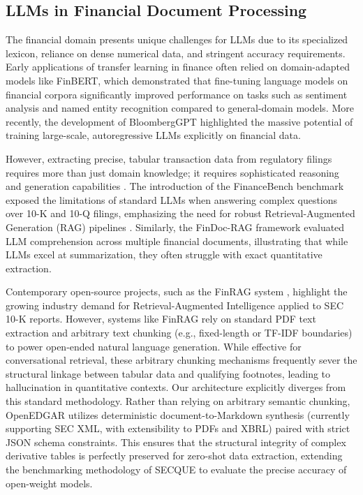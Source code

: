 \documentclass[journal, onecolumn]{IEEEtran}
\begin{document}
\subsection{LLMs in Financial Document Processing}
The financial domain presents unique challenges for LLMs due to its specialized lexicon, reliance on dense numerical data, and stringent accuracy requirements. Early applications of transfer learning in finance often relied on domain-adapted models like FinBERT, which demonstrated that fine-tuning language models on financial corpora significantly improved performance on tasks such as sentiment analysis and named entity recognition compared to general-domain models. More recently, the development of BloombergGPT \cite{wu2023bloomberggpt} highlighted the massive potential of training large-scale, autoregressive LLMs explicitly on financial data. 

However, extracting precise, tabular transaction data from regulatory filings requires more than just domain knowledge; it requires sophisticated reasoning and generation capabilities \cite{eval_table_extraction_2025}. The introduction of the FinanceBench benchmark \cite{islam2023financebench} exposed the limitations of standard LLMs when answering complex questions over 10-K and 10-Q filings, emphasizing the need for robust Retrieval-Augmented Generation (RAG) pipelines \cite{lewis2020rag}. Similarly, the FinDoc-RAG framework \cite{gu2025findocrag} evaluated LLM comprehension across multiple financial documents, illustrating that while LLMs excel at summarization, they often struggle with exact quantitative extraction. 

Contemporary open-source projects, such as the FinRAG system \cite{salunke2024finrag}, highlight the growing industry demand for Retrieval-Augmented Intelligence applied to SEC 10-K reports. However, systems like FinRAG rely on standard PDF text extraction and arbitrary text chunking (e.g., fixed-length or TF-IDF boundaries) to power open-ended natural language generation. While effective for conversational retrieval, these arbitrary chunking mechanisms frequently sever the structural linkage between tabular data and qualifying footnotes, leading to hallucination in quantitative contexts. Our architecture explicitly diverges from this standard methodology. Rather than relying on arbitrary semantic chunking, OpenEDGAR utilizes deterministic document-to-Markdown synthesis (currently supporting SEC XML, with extensibility to PDFs and XBRL) paired with strict JSON schema constraints. This ensures that the structural integrity of complex derivative tables is perfectly preserved for zero-shot data extraction, extending the benchmarking methodology of SECQUE \cite{yoash2025secque} to evaluate the precise accuracy of open-weight models.
\end{document}
